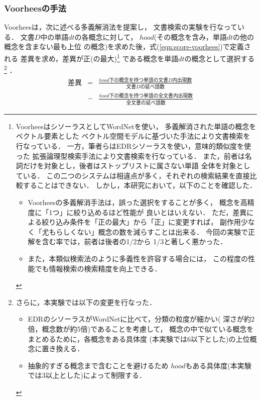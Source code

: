 \subsubsection{Voorheesの手法}\label{sec:voorhees-apply}
\vspace*{-1mm}
  Voorheesは，次に述べる多義解消法を提案し，
文書検索の実験を行なっている\cite{Voorhees93}．
  文書$D$中の単語$dt$の各概念に対して，
{\boldmath $hood$}(その概念を含み，単語$dt$の他の概念を含まない最も上位
の概念)を求めた後，式(\ref{eqn:score-voorhees})で定義される
{\dg 差異}を求め，差異が正(の最大)\footnote{
\topsep=0mm
\topskip=0mm
\partopsep=0mm
\parskip=0mm
\parsep=0mm
VoorheesはシソーラスとしてWordNetを使い，
多義解消された単語の概念をベクトル要素とした
ベクトル空間モデルに基づいた手法により文書検索を行なっている．
一方，筆者らはEDRシソーラスを使い，意味的類似度を使った
拡張論理型検索手法により文書検索を行なっている．
また，前者は名詞だけを対象とし，後者はストップリストに属さない単語
全体を対象としている．
この二つのシステムは相違点が多く，それぞれの検索結果を直接比較することはできない．
しかし，本研究において，以下のことを確認した．
\begin{itemize}
\topsep=0mm
\partopsep=0mm
\parskip=0mm
\parsep=0mm
\itemsep=0mm
\item 
Voorheesの多義解消手法は，誤った選択をすることが多く，
概念を高精度に「1つ」に絞り込めるほど性能が
良いとはいえない．
ただ，差異による{\dg 絞り込み条件を「正の最大」から「正」に変更}すれば，
副作用少なく「尤もらしくない」概念の数を減らすことは出来る．
今回の実験で正解を含む率では，前者は後者の1/2から
1/3と著しく悪かった．
\item
また，本類似検索法のように多義性を許容する場合には，
この程度の性能でも情報検索の検索精度を向上できる．
\end{itemize}
}
である概念を単語$dt$の概念として選択する
\footnote{
さらに，本実験では以下の変更を行なった．
\begin{itemize}
\topsep=0mm
\partopsep=0mm
\parskip=0mm
\parsep=0mm
\itemsep=0mm
\item 
EDRのシソーラスがWordNetに比べて，分類の粒度が細かい(
深さが約2倍，概念数が約5倍)であることを考慮して，
概念の中で似ている概念をまとめるために，各概念をある具体度
(本実験では6以下とした)の上位概念に置き換える．
\item
抽象的すぎる概念まで含むことを避けるため
$hood$もある具体度(本実験では3以上とした)によって制限する．
\end{itemize}
}
．
\begin{eqnarray}
 差異 & = & \displaystyle 
\frac{hood下の概念を持つ単語の文書D内出現数}{文書Dの延べ語数}\nonumber\\[1ex]
       & - & \frac{hood下の概念を持つ単語の全文書内出現数}{全文書の延べ語数}\label{eqn:score-voorhees}
\end{eqnarray}


